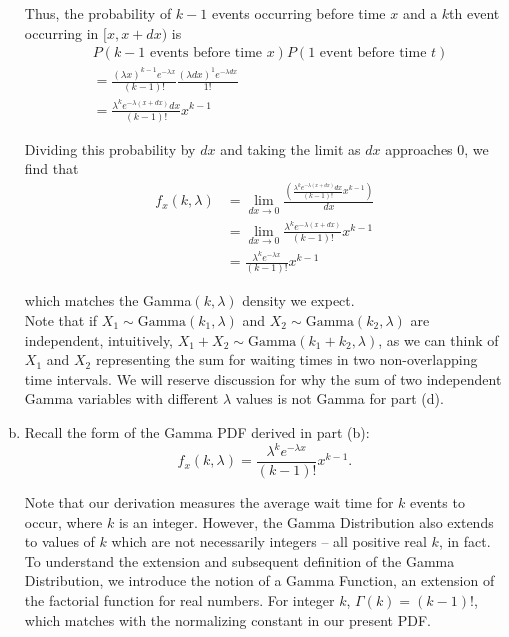\begin{enumerate}[a)]
    Thus, the probability of $k-1$ events occurring before time $x$ and a $k$th event occurring in $[x, x+dx)$ is 
    \begin{align*}
        &P(\text{$k - 1$ events before time $x$}) P(\text{$1$ event before time $t$}) \\
        &= \frac{(\lambda x)^{k-1} e^{-\lambda x}}{(k-1)!} \frac{(\lambda dx)^{1} e^{-\lambda dx}}{1!} \\
        &= \frac{\lambda^k e^{-\lambda (x+dx)}dx}{(k-1)!}x^{k-1}
    \end{align*}

    Dividing this probability by $dx$ and taking the limit as $dx$ approaches $0$, we find that
    \begin{align*}
        f_x(k, \lambda) &= \lim_{dx \to 0} \frac{\left( \frac{\lambda^k e^{-\lambda (x+dx)}dx}{(k-1)!}x^{k-1} \right) }{dx} \\
        &= \lim_{dx \to 0} \frac{\lambda^k e^{-\lambda (x+dx)}}{(k-1)!} x^{k-1} \\
        &= \frac{\lambda^k e^{-\lambda x}}{(k-1)!} x^{k-1}
    \end{align*}

    which matches the Gamma$(k, \lambda)$ density we expect. \\

    Note that if $X_1 \sim \mathrm{Gamma}(k_1, \lambda)$ and $X_2 \sim \mathrm{Gamma}(k_2, \lambda)$ are independent, intuitively, 
    $X_1 + X_2 \sim \mathrm{Gamma}(k_1 + k_2, \lambda)$, as we can think of $X_1$ and $X_2$ representing the sum for waiting times in two non-overlapping time intervals.
    We will reserve discussion for why the sum of two independent Gamma variables with different $\lambda$ values is not Gamma for part (d). 
    
    \item Recall the form of the Gamma PDF derived in part (b): 
    \[
        f_x(k, \lambda) = \frac{\lambda^k e^{-\lambda x}}{(k-1)!} x^{k-1}.
    \]

    Note that our derivation measures the average wait time for $k$ events to occur, where $k$ is an integer. 
    However, the Gamma Distribution also extends to values of $k$ which are not necessarily integers -- all positive real $k$, in fact. To understand the extension
    and subsequent definition of the Gamma Distribution, we introduce the notion of a Gamma Function, an extension of the factorial function for real numbers. 
    For integer $k$, $\Gamma(k) = (k-1)!$, which matches with the normalizing constant in our present PDF. \\


\end{enumerate}
